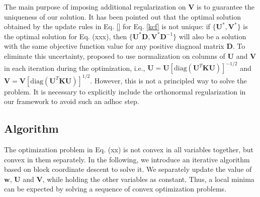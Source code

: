 \documentclass[10pt,journal,compsoc]{IEEEtran}
\newcommand{\diag}{\mathrm{diag}}
\begin{document}
The main purpose of imposing additional regularization on $\mathbf{V}$ is to guarantee the uniqueness of our solution. It has been pointed out that \cite{cf} the optimal solution obtained by the update rules in Eq. \eqref{} for Eq. \eqref{kcf} is not unique:  if $\{\mathbf{U}^* ,\mathbf{V}^* \}$ is the optimal solution for Eq. (xxx), then $\{\mathbf{U}^* \mathbf{D} ,\mathbf{V}^*\mathbf{D}^{-1} \}$ will also be a solution with the same objective function value for any positive diagnoal matrix $\mathbf{D}$. To eliminate this uncertainty, \cite{cf} proposed to use normalization on columns of $\mathbf{U}$ and $\mathbf{V}$ in each iteration during the optimization, i.e., $\mathbf{U} = \mathbf{U} [\diag(\mathbf{U}^T \mathbf{K}\mathbf{U})]^{-1/2}$ and $\mathbf{V} = \mathbf{V} [\diag(\mathbf{U}^T \mathbf{K}\mathbf{U})]^{1/2}$. However, this is not a principled way to solve the problem. It is necessary to explicitly include the orthonormal regularization in our framework to avoid such an adhoc step.
\subsection{Algorithm}
The optimization problem in Eq. (xx) is not convex in all variables together, but convex in them separately. In the following, we introduce an iterative algorithm based on block coordinate descent to solve it. We separately update the value of $\mathbf{w}$, $\mathbf{U}$ and $\mathbf{V}$, while holding the other variables as constant. Thus, a local minima can be expected by solving a sequence of convex optimization problems.
\end{document}
